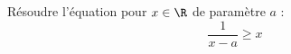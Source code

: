 
\begin{exercice}
Résoudre l'équation pour $x\in \R$ de paramètre $a$  : 
$$\frac{1}{x-a} \geq x$$
\end{exercice}